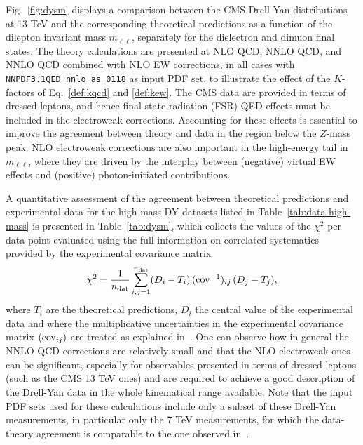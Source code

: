 \documentclass[withindex,glossary]{cam-thesis}
\begin{document}
Fig.~\ref{fig:dysm} displays a comparison between the CMS Drell-Yan distributions
at 13 TeV and the corresponding theoretical predictions as a function of the
dilepton invariant mass $m_{\ell\ell}$, separately for the dielectron
and dimuon final states.
The theory calculations are presented at NLO QCD, NNLO QCD, and NNLO QCD combined with
NLO EW corrections, in all
cases with {\tt NNPDF3.1QED\_nnlo\_as\_0118} as input PDF set, to illustrate the
effect of the $K$-factors of Eq.~\eqref{def:kqcd} and
\eqref{def:kew}.
%
The CMS data are provided
in terms of dressed leptons, and hence final state radiation (FSR) QED effects must be included in the electroweak
corrections.
%
Accounting for these effects is essential to improve the agreement
between theory and data in the region below the $Z$-mass peak.
%
NLO electroweak corrections are also important in the high-energy tail in $m_{\ell\ell}$,
where they are driven by the interplay between (negative) virtual EW effects
and (positive) photon-initiated contributions.

A quantitative assessment of the agreement between theoretical predictions and experimental 
data for the high-mass DY datasets listed in Table~\ref{tab:data-high-mass}
is presented in Table~\ref{tab:dysm}, which collects the  values of the $\chi^2$ per data point
evaluated using the full information on correlated systematics
provided by the experimental covariance
matrix
\begin{equation}
  \label{eq:chi2}
\chi^2=\frac{1}{n_{\rm dat}}\sum_{i,j=1}^{n_{\rm
    dat}}(D_i-T_i)\,({\rm cov}^{-1})_{ij}\, (D_j-T_j),
\end{equation}
where $T_i$ are the theoretical predictions, $D_i$ the central value
of the experimental data and where the multiplicative uncertainties in
the experimental covariance matrix $({\rm cov}_{ij})$ are treated as explained in~\cite{Ball:2009qv,Ball:2012wy}.
%
One can observe how in general the NNLO QCD corrections are relatively
small and that the NLO electroweak
ones can be significant, especially for observables presented 
in terms of dressed leptons (such as the CMS 13 TeV ones) and are required to achieve a good description of the Drell-Yan
data in the whole kinematical range available.
%
Note that the input PDF sets used for these calculations include 
only a subset of these Drell-Yan measurements, in particular only the 7 TeV measurements, 
for which the data-theory agreement is comparable to the one observed in~\cite{Ball:2017nwa}.
\end{document}
